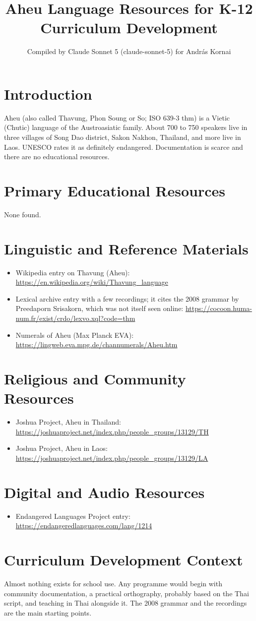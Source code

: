 \documentclass[12pt]{article}
\title{Aheu Language Resources for K-12 Curriculum Development}
\author{Compiled by Claude Sonnet 5 (claude-sonnet-5) for Andr\'as Kornai}
\date{}
\begin{document}
\maketitle

\section{Introduction}
Aheu (also called Thavung, Phon Soung or So; ISO 639-3 thm) is a Vietic (Chutic) language of the Austroasiatic family. About 700 to 750 speakers live in three villages of Song Dao district, Sakon Nakhon, Thailand, and more live in Laos. UNESCO rates it as definitely endangered. Documentation is scarce and there are no educational resources.

\section{Primary Educational Resources}
None found.

\section{Linguistic and Reference Materials}
\begin{itemize}
\item Wikipedia entry on Thavung (Aheu): \url{https://en.wikipedia.org/wiki/Thavung_language}
\item Lexical archive entry with a few recordings; it cites the 2008 grammar by Preedaporn Srisakorn, which was not itself seen online: \url{https://cocoon.huma-num.fr/exist/crdo/lexvo.xql?code=thm}
\item Numerals of Aheu (Max Planck EVA): \url{https://lingweb.eva.mpg.de/channumerals/Aheu.htm}
\end{itemize}

\section{Religious and Community Resources}
\begin{itemize}
\item Joshua Project, Aheu in Thailand: \url{https://joshuaproject.net/index.php/people_groups/13129/TH}
\item Joshua Project, Aheu in Laos: \url{https://joshuaproject.net/index.php/people_groups/13129/LA}
\end{itemize}

\section{Digital and Audio Resources}
\begin{itemize}
\item Endangered Languages Project entry: \url{https://endangeredlanguages.com/lang/1214}
\end{itemize}

\section{Curriculum Development Context}
Almost nothing exists for school use. Any programme would begin with community documentation, a practical orthography, probably based on the Thai script, and teaching in Thai alongside it. The 2008 grammar and the recordings are the main starting points.
\end{document}
